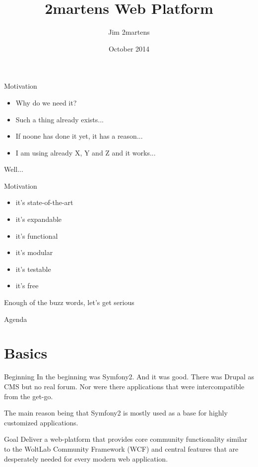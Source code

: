 \documentclass{beamer}
\begin{document}
\author{Jim 2martens}
\title{2martens Web Platform}
\date{October 2014}

	\begin{frame}
		\titlepage
	\end{frame}
	
	\begin{frame}{Motivation}
		\begin{itemize}
			\item Why do we need it?
			\item Such a thing already exists...
			\item If noone has done it yet, it has a reason...
			\item I am using already X, Y and Z and it works...
		\end{itemize}
		
		Well...
	\end{frame}
	
	\begin{frame}{Motivation}
		\begin{itemize}
			\item it's state-of-the-art
			\item it's expandable
			\item it's functional
			\item it's modular
			\item it's testable
			\item it's free
		\end{itemize}
		
		Enough of the buzz words, let's get serious
	\end{frame}	
	
	\begin{frame}{Agenda}
		\tableofcontents
	\end{frame}
	
	\section{Basics}
	\begin{frame}{Beginning}
		In the beginning was Symfony2. And it was good. There was Drupal as CMS but no real forum. Nor were there
		applications that were intercompatible from the get-go.
		
		The main reason being that Symfony2 is mostly used as a base for highly customized applications.
	\end{frame}
	
	\begin{frame}{Goal}
		Deliver a web-platform that provides core community functionality similar to the WoltLab Community Framework (WCF)
		and central features that are desperately needed for every modern web application.
	\end{frame}
	
\end{document}

